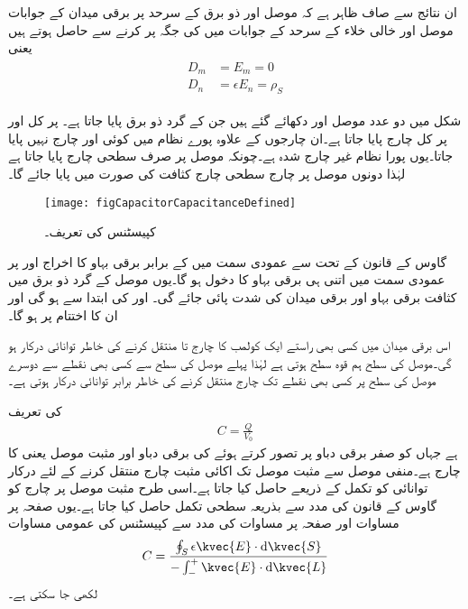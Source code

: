 ان نتائج سے صاف  ظاہر ہے کہ موصل اور ذو برق کے سرحد پر برقی میدان کے جوابات موصل اور خالی خلاء کے سرحد کے جوابات میں  کی جگہ  پر کرنے سے حاصل ہوتے ہیں یعنی
\begin{gather}
\begin{aligned}
D_m&=E_m=0\\
D_n&=\epsilon E_n=\rho_S
\end{aligned}
\end{gather}



شکل  میں دو عدد موصل  اور   دکھائے گئے ہیں جن کے گرد ذو برق پایا جاتا ہے۔ پر کل  اور  پر کل  چارج پایا جاتا ہے۔ان چارجوں کے علاوہ پورے نظام میں کوئی اور چارج نہیں پایا جاتا۔یوں پورا نظام غیر چارج شدہ ہے۔چونکہ موصل پر صرف سطحی چارج پایا جاتا ہے لہٰذا دونوں موصل پر چارج سطحی چارج کثافت کی صورت میں پایا جائے گا۔

\begin{figure}
\centering
\texttt{[image: figCapacitorCapacitanceDefined]}
\caption{کپیسٹنس کی تعریف۔}
\label{شکل_کپیسٹر_کپیسٹنس_کی_تعریف}
\end{figure}

گاوس کے قانون کے تحت  سے عمودی سمت میں  کے برابر برقی بہاو کا اخراج  اور   پر عمودی سمت میں اتنی ہی برقی بہاو کا دخول ہو گا۔یوں موصل کے گرد ذو برق میں کثافت برقی بہاو  اور برقی میدان کی شدت  پائی جائے گی۔ اور  کی ابتدا  سے ہو گی اور ان کا اختتام  پر ہو گا۔

اس برقی میدان میں  کسی بھی راستے  ایک کولمب کا چارج  تا  منتقل کرنے کی خاطر  توانائی درکار ہو گی۔موصل کی سطح ہم قوہ سطح ہوتی ہے لہٰذا پہلے موصل کی سطح سے کسی بھی نقطے سے دوسرے  موصل کی سطح پر کسی بھی نقطے تک چارج منتقل کرنے کی خاطر برابر توانائی درکار ہوتی ہے۔

  کی تعریف
\begin{align}
C=\frac{Q}{V_0}
\end{align}
ہے جہاں  کو صفر برقی دباو پر تصور کرتے ہوئے  کی برقی دباو  اور  مثبت موصل یعنی  کا چارج  ہے۔منفی موصل سے مثبت موصل تک اکائی مثبت چارج منتقل کرنے کے لئے درکار توانائی  کو تکمل کے ذریعے حاصل کیا جاتا ہے۔اسی طرح مثبت موصل پر چارج   کو گاوس کے قانون کی مدد سے بذریعہ سطحی تکمل  حاصل  کیا جاتا ہے۔یوں صفحہ  پر مساوات  اور صفحہ  پر مساوات  کی مدد سے کپیسٹنس کی عمومی مساوات
\begin{align}
C=\frac{\oint_S  \epsilon \kvec{E} \cdot \dif \kvec{S} }{-\int_{-}^{+} \kvec{E} \cdot \dif \kvec{L}}
\end{align}
لکھی جا سکتی ہے۔

